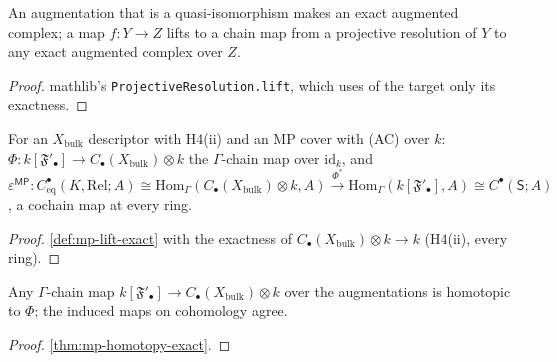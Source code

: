 \begin{definition}\label{def:mp-lift-exact}
  \leanok
  An augmentation that is a quasi-isomorphism makes an exact augmented complex; a map $f\colon Y\to Z$ lifts to a chain map
  from a projective resolution of $Y$ to any exact augmented complex over $Z$.
\end{definition}
\begin{proof}
  \leanok
  mathlib's \texttt{ProjectiveResolution.lift}, which uses of the target only its exactness.
\end{proof}

\begin{definition}\label{def:mp-epsmp}
  \leanok
  For an $X_{\mathrm{bulk}}$ descriptor with H4(ii) and an MP cover with (AC) over $k$: $\Phi\colon k[\mathfrak F'_\bullet]\to C_\bullet(X_{\mathrm{bulk}})\otimes k$
  the $\Gamma$-chain map over $\mathrm{id}_k$, and $\varepsilon^{\mathsf{MP}}\colon C^\bullet_{\mathrm{eq}}(K,\mathrm{Rel};A)\cong\mathrm{Hom}_\Gamma(C_\bullet(X_{\mathrm{bulk}})\otimes k,A)
  \xrightarrow{\Phi^*}\mathrm{Hom}_\Gamma(k[\mathfrak F'_\bullet],A)\cong C^\bullet(\mathsf S;A)$, a cochain map at every ring.
\end{definition}
\begin{proof}
  \leanok
  \ref{def:mp-lift-exact} with the exactness of $C_\bullet(X_{\mathrm{bulk}})\otimes k\to k$ (H4(ii), every ring).
\end{proof}

\begin{theorem}\label{thm:mp-epsmp-canonical}
  \leanok
  Any $\Gamma$-chain map $k[\mathfrak F'_\bullet]\to C_\bullet(X_{\mathrm{bulk}})\otimes k$ over the augmentations is homotopic to $\Phi$; the
  induced maps on cohomology agree.
\end{theorem}
\begin{proof}
  \leanok
  \ref{thm:mp-homotopy-exact}.
\end{proof}

